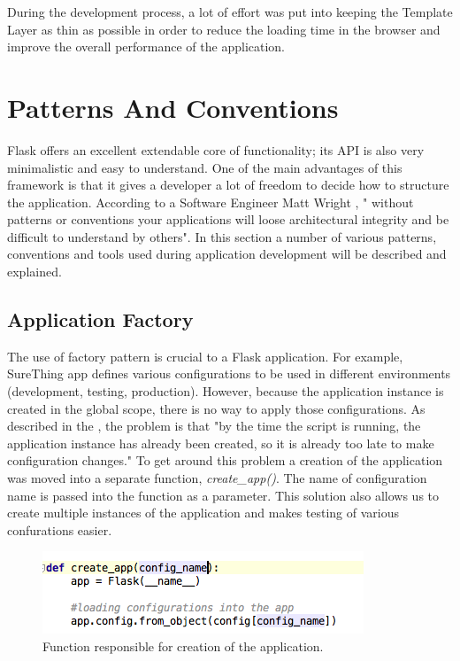 During the development process, a lot of effort was put into keeping the Template Layer as thin as possible in order to reduce the loading time in the browser and improve the overall performance of the application.

\section{Patterns And Conventions}
Flask offers an excellent extendable core of functionality; its API is also very minimalistic and easy to understand. One of the  main advantages of this framework is that it gives a developer a lot of freedom to decide how to structure the application. According to a Software Engineer Matt Wright \cite{article:howIstructureMyFlaskApps}, " without patterns or conventions your applications will loose architectural integrity and be difficult to understand by others". In this section a number of various patterns, conventions and tools used during application development will be described and explained. 

\subsection{Application Factory}
The use of factory pattern is crucial to a Flask application. For example, SureThing app defines various configurations to be used in different environments (development, testing, production). However, because the application instance is created in the global scope, there is no way to apply those configurations. As described in the \cite{book:Grindberg2014FlaskWebDevelopment}, the problem is that "by the time the script is running, the application instance has already been created, so it is already too late to make configuration changes." To get around this problem a creation of the application was moved into a separate function, \emph{create\_app()}. The name of configuration name is passed into the function as a parameter. This solution also allows us to create multiple instances of the application and makes testing of various confurations easier.\cite{documentation:FlaskApplicationFactories} 

\begin{figure}[H]
	\begin{center}
		\includegraphics[width=.40\linewidth,natwidth=610,natheight=642]{impl/images/createApp}
		\caption{Function responsible for creation of the application.} \label{fig:using:createApp}
	\end{center}
\end{figure}

